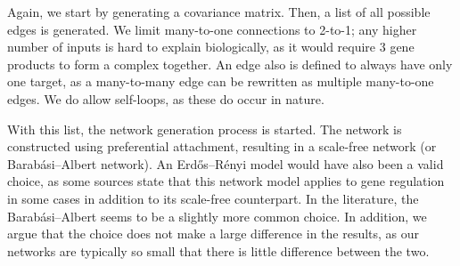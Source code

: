 \documentclass[../main.tex]{subfiles}
\begin{document}
Again, we start by generating a covariance matrix. Then, a list of all possible edges is generated.
We limit many-to-one connections to 2-to-1; any higher number of inputs is hard to explain biologically, as it would require 3 gene products to form a complex together.
An edge also is defined to always have only one target, as a many-to-many edge can be rewritten as multiple many-to-one edges.
We do allow self-loops, as these do occur in nature.

With this list, the network generation process is started.
The network is constructed using preferential attachment, resulting in a scale-free network (or Barabási–Albert network).
An Erdős–Rényi model would have also been a valid choice, as some sources state that this network model applies to gene regulation in some cases in addition to its scale-free counterpart.
In the literature, the Barabási–Albert seems to be a slightly more common choice.
In addition, we argue that the choice does not make a large difference in the results, as our networks are typically so small that there is little difference between the two.
\end{document}
